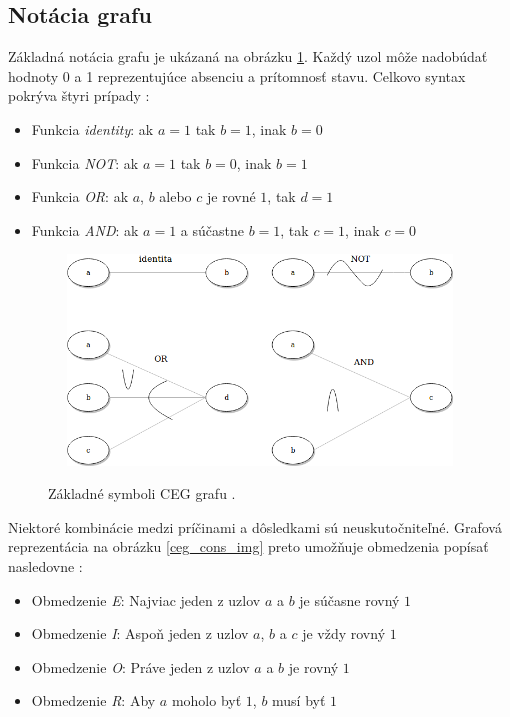 \subsection*{Notácia grafu}
Základná notácia grafu je ukázaná na obrázku \ref{ceg_img}. Každý uzol môže nadobúdať hodnoty 0 a 1 reprezentujúce absenciu a prítomnosť stavu. Celkovo syntax pokrýva štyri prípady \cite{Ast}: 
 \begin{itemize}
 	\item{Funkcia \textit{identity}: ak \(a = 1\) tak \(b = 1\), inak \(b = 0\) 
 	}
 	\item{Funkcia \textit{NOT}: ak \(a = 1\) tak \(b = 0\), inak \(b = 1\) 
 	}
 	\item{Funkcia \textit{OR}: ak \(a\), \(b\) alebo \(c\) je rovné \(1\), tak \(d = 1\) 
 	} 		
 	\item{Funkcia \textit{AND}: ak \(a = 1\) a súčastne \(b = 1\), tak \(c = 1\), inak \(c = 0\)  
 	} 
 \end{itemize}
\begin{figure}[h]\centering
	\centering
	\includegraphics[width=4.5in,height=2.2in]{obrazky-figures/ceg.png}\\[1pt]
	\caption{Základné symboli CEG grafu \cite{Ast}.}
	\label{ceg_img}
\end{figure}
Niektoré kombinácie medzi príčinami a dôsledkami sú neuskutočniteľné. Grafová reprezentácia na obrázku \ref{ceg_cons_img} preto umožňuje obmedzenia popísať nasledovne \cite{Ast}:
 \begin{itemize}
 	\item{Obmedzenie \textit{E}: Najviac jeden z uzlov \(a\) a \(b\) je súčasne rovný \(1\) 
 	}
 	\item{Obmedzenie \textit{I}: Aspoň jeden z uzlov \(a\), \(b\) a \(c\) je vždy rovný \(1\) 
 	}
 	\item{Obmedzenie \textit{O}: Práve jeden z uzlov \(a\) a \(b\) je  rovný \(1\) 
 	} 		
 	\item{Obmedzenie \textit{R}: Aby \(a\) moholo byť \(1\), \(b\) musí byť \(1\) 
 	}
 \end{itemize}    
